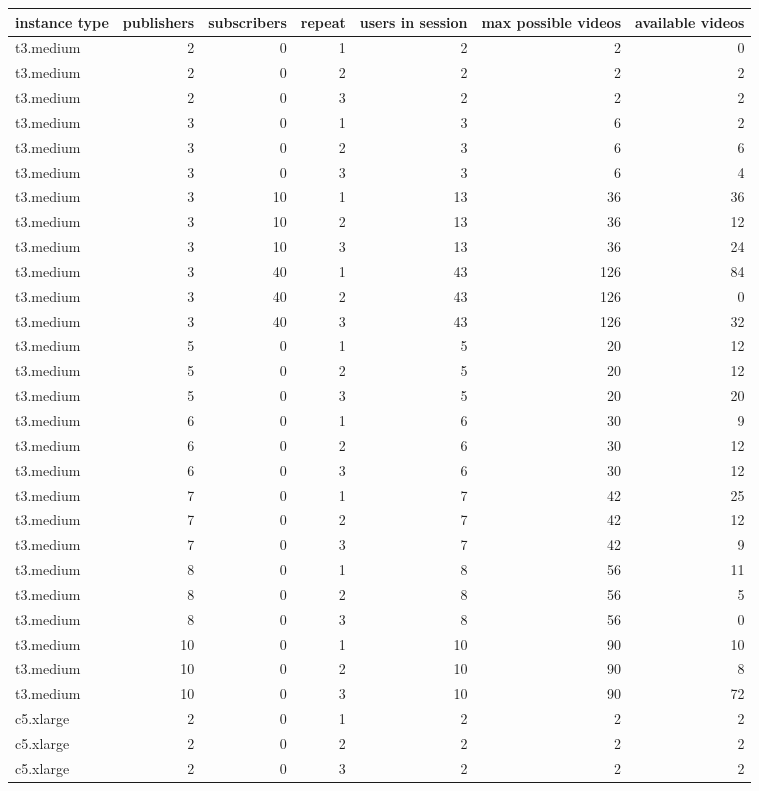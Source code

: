 \begin{tabular}{lrrrrrr}
\toprule
instance type & publishers & subscribers & repeat & users in session & max possible videos & available videos \\
\midrule
t3.medium & 2 & 0 & 1 & 2 & 2 & 0 \\
t3.medium & 2 & 0 & 2 & 2 & 2 & 2 \\
t3.medium & 2 & 0 & 3 & 2 & 2 & 2 \\
t3.medium & 3 & 0 & 1 & 3 & 6 & 2 \\
t3.medium & 3 & 0 & 2 & 3 & 6 & 6 \\
t3.medium & 3 & 0 & 3 & 3 & 6 & 4 \\
t3.medium & 3 & 10 & 1 & 13 & 36 & 36 \\
t3.medium & 3 & 10 & 2 & 13 & 36 & 12 \\
t3.medium & 3 & 10 & 3 & 13 & 36 & 24 \\
t3.medium & 3 & 40 & 1 & 43 & 126 & 84 \\
t3.medium & 3 & 40 & 2 & 43 & 126 & 0 \\
t3.medium & 3 & 40 & 3 & 43 & 126 & 32 \\
t3.medium & 5 & 0 & 1 & 5 & 20 & 12 \\
t3.medium & 5 & 0 & 2 & 5 & 20 & 12 \\
t3.medium & 5 & 0 & 3 & 5 & 20 & 20 \\
t3.medium & 6 & 0 & 1 & 6 & 30 & 9 \\
t3.medium & 6 & 0 & 2 & 6 & 30 & 12 \\
t3.medium & 6 & 0 & 3 & 6 & 30 & 12 \\
t3.medium & 7 & 0 & 1 & 7 & 42 & 25 \\
t3.medium & 7 & 0 & 2 & 7 & 42 & 12 \\
t3.medium & 7 & 0 & 3 & 7 & 42 & 9 \\
t3.medium & 8 & 0 & 1 & 8 & 56 & 11 \\
t3.medium & 8 & 0 & 2 & 8 & 56 & 5 \\
t3.medium & 8 & 0 & 3 & 8 & 56 & 0 \\
t3.medium & 10 & 0 & 1 & 10 & 90 & 10 \\
t3.medium & 10 & 0 & 2 & 10 & 90 & 8 \\
t3.medium & 10 & 0 & 3 & 10 & 90 & 72 \\
c5.xlarge & 2 & 0 & 1 & 2 & 2 & 2 \\
c5.xlarge & 2 & 0 & 2 & 2 & 2 & 2 \\
c5.xlarge & 2 & 0 & 3 & 2 & 2 & 2 \\

\end{tabular}
